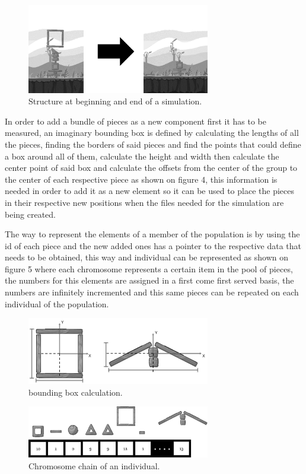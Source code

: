 \documentclass[graybox]{svmult}
\begin{document}
\begin{figure}[htbp]
\centerline{\includegraphics[width=80mm]{Images/simulation_bef_aft_example.png}}
\caption{Structure at beginning and end of a simulation.}
\label{fig}
\end{figure}

In order to add a bundle of pieces as a new component first it has to be measured, an imaginary bounding box is defined by calculating the lengths of all the pieces, finding the borders of said pieces and find the points that could define a box around all of them, calculate the height and width then calculate the center point of said box and calculate the offsets from the center of the group to the center of each respective piece as shown on figure 4, this information is needed in order to add it as a new element so it can be used to place the pieces in their respective new positions when the files needed for the simulation are being created.

The way to represent the elements of a member of the population is by using the id of each piece and the new added ones has a pointer to the respective data that needs to be obtained, this way and individual can be represented as shown on figure 5 where each chromosome represents a certain item in the pool of pieces, the numbers for this elements are assigned in a first come first served basis, the numbers are infinitely incremented and this same pieces can be repeated on each individual of the population.

\begin{figure}[htbp]
\centerline{\includegraphics[width=80mm]{Images/bounding_box_calculation.png}}
\caption{bounding box calculation.}
\label{fig}
\end{figure}

\begin{figure}[htbp]
\centerline{\includegraphics[width=80mm]{Images/chromosome_chain_example.png}}
\caption{Chromosome chain of an individual.}
\label{fig}
\end{figure}
\end{document}
